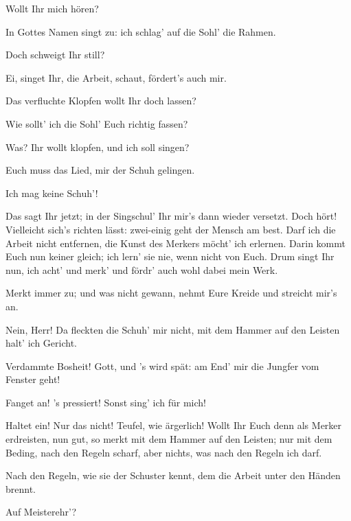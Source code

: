 \begin{drama}
\Beckmesserspeaks
Wollt Ihr mich hören?

\Sachsspeaks
In Gottes Namen
singt zu:
ich schlag' auf die Sohl' die Rahmen.

\Beckmesserspeaks
Doch schweigt Ihr still?

\Sachsspeaks
Ei, singet Ihr,
die Arbeit, schaut, fördert's auch mir.

\Beckmesserspeaks
Das verfluchte Klopfen wollt Ihr doch lassen?

\Sachsspeaks
Wie sollt' ich die Sohl' Euch richtig fassen?

\Beckmesserspeaks
Was? Ihr wollt klopfen, und ich soll singen?

\Sachsspeaks
Euch muss das Lied, mir der Schuh gelingen.

\Beckmesserspeaks
Ich mag keine Schuh'!

\Sachsspeaks
Das sagt Ihr jetzt;
in der Singschul' Ihr mir's dann wieder versetzt.
Doch hört! Vielleicht sich's richten lässt:
zwei-einig geht der Mensch am best.
Darf ich die Arbeit nicht entfernen,
die Kunst des Merkers möcht' ich erlernen.
Darin kommt Euch nun keiner gleich;
ich lern' sie nie, wenn nicht von Euch.
Drum singt Ihr nun, ich acht' und merk'
und fördr' auch wohl dabei mein Werk.

\Beckmesserspeaks
Merkt immer zu; und was nicht gewann,
nehmt Eure Kreide und streicht mir's an.

\Sachsspeaks
Nein, Herr! Da fleckten die Schuh' mir nicht,
mit dem Hammer auf den Leisten halt' ich Gericht.

\Beckmesserspeaks
Verdammte Bosheit! Gott, und 's wird spät:
am End' mir die Jungfer vom Fenster geht!


\Sachsspeaks


Fanget an! 's pressiert! Sonst sing' ich für mich!

\Beckmesserspeaks

Haltet ein! Nur das nicht! Teufel, wie ärgerlich!
Wollt Ihr Euch denn als Merker erdreisten,
nun gut, so merkt mit dem Hammer auf den Leisten;
nur mit dem Beding, nach den Regeln scharf,
aber nichts, was nach den Regeln ich darf.

\Sachsspeaks

Nach den Regeln, wie sie der Schuster kennt,
dem die Arbeit unter den Händen brennt.

\Beckmesserspeaks
Auf Meisterehr'?


\end{drama}
